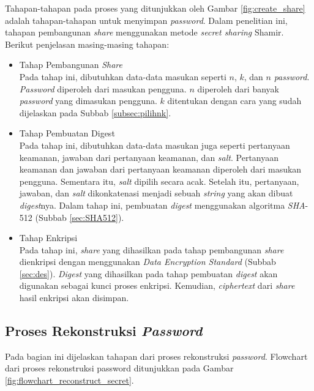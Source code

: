Tahapan-tahapan pada proses yang ditunjukkan oleh Gambar \ref{fig:create_share} adalah tahapan-tahapan untuk menyimpan \textit{password}. Dalam penelitian ini, tahapan pembangunan \textit{share} menggunakan metode \textit{secret sharing} Shamir. Berikut penjelasan masing-masing tahapan:

\begin{itemize}
	\item Tahap Pembangunan \textit{Share} \\
	Pada tahap ini, dibutuhkan data-data masukan seperti $n$, $k$, dan $n$ \textit{password}. \textit{Password} diperoleh dari masukan pengguna. $n$ diperoleh dari banyak \textit{password} yang dimasukan pengguna. $k$ ditentukan dengan cara yang sudah dijelaskan pada Subbab \ref{subsec:pilihnk}.
	\item Tahap Pembuatan Digest \\
	Pada tahap ini, dibutuhkan data-data masukan juga seperti pertanyaan keamanan, jawaban dari pertanyaan keamanan, dan \textit{salt}. Pertanyaan keamanan dan jawaban dari pertanyaan keamanan diperoleh dari masukan pengguna. Sementara itu, \textit{salt} dipilih secara acak. Setelah itu, pertanyaan, jawaban, dan \textit{salt} dikonkatenasi menjadi sebuah \textit{string} yang akan dibuat \textit{digest}nya. Dalam tahap ini, pembuatan \textit{digest} menggunakan algoritma \textit{SHA}-512 (Subbab \ref{sec:SHA512}).
	\item Tahap Enkripsi \\
	Pada tahap ini, \textit{share} yang dihasilkan pada tahap pembangunan \textit{share} dienkripsi dengan menggunakan \textit{Data Encryption Standard} (Subbab \ref{sec:des}). \textit{Digest} yang dihasilkan pada tahap pembuatan \textit{digest} akan digunakan sebagai kunci proses enkripsi. Kemudian, \textit{ciphertext} dari \textit{share} hasil enkripsi akan disimpan.
\end{itemize}

\subsection{Proses Rekonstruksi \textit{Password}}

Pada bagian ini dijelaskan tahapan dari proses rekonstruksi \textit{password}. Flowchart dari proses rekonstruksi password ditunjukkan pada Gambar \ref{fig:flowchart_reconstruct_secret}.


